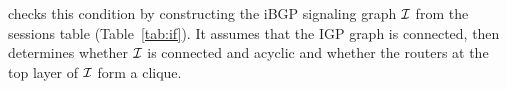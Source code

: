 


\rcc checks this condition by constructing the iBGP signaling
graph $\mathcal{I}$ from the {\tf sessions} table (Table~\ref{tab:if}). It assumes
that the IGP graph is connected, then determines whether $\mathcal{I}$ is
connected and acyclic and whether the routers at the top layer of $\mathcal{I}$ form
a clique.

